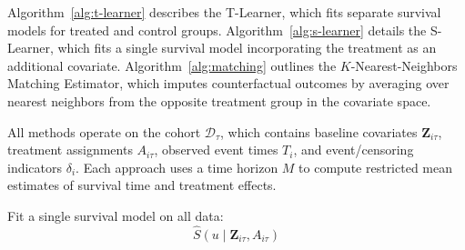 Algorithm~\ref{alg:t-learner} describes the T-Learner, which fits separate survival models for treated and control groups. Algorithm~\ref{alg:s-learner} details the S-Learner, which fits a single survival model incorporating the treatment as an additional covariate. 
Algorithm~\ref{alg:matching} outlines the \(K\)-Nearest-Neighbors Matching Estimator, which imputes counterfactual outcomes by averaging over nearest neighbors from the opposite treatment group in the covariate space.

All methods operate on the cohort \(\mathcal{D}_\tau\), which contains baseline covariates \(\mathbf{Z}_{i\tau}\), treatment assignments \(A_{i\tau}\), observed event times \(T_i\), and event/censoring indicators \(\delta_i\). 
Each approach uses a time horizon \(M\) to compute restricted mean estimates of survival time and treatment effects.

\begin{algorithm}[t]
\caption{S-Learner for Restricted Mean Event Time}
\label{alg:s-learner}

Fit a single survival model on all data:\;
\[
\widehat{S}(u \mid \mathbf{Z}_{i\tau}, A_{i\tau})
\]


\Return{
\[
\widehat{\psi}_{\mathrm{S\text{-}learner}} = \frac{1}{N} \sum_{i=1}^N \Bigl(\widehat{\mu}(\mathbf{Z}_{i\tau},1) - \widehat{\mu}(\mathbf{Z}_{i\tau},0)\Bigr)
\]
}
\end{algorithm}


